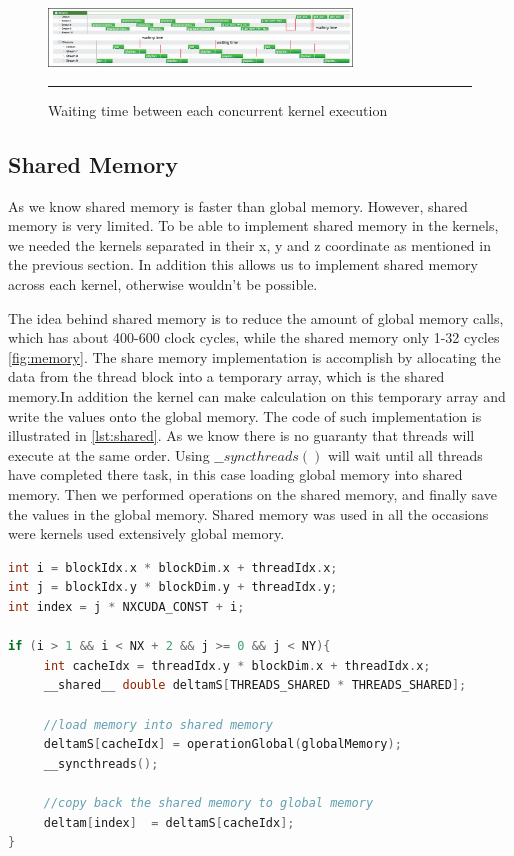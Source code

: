\begin{figure}[htbp]
	\centering
		\includegraphics[width=0.72\textwidth]{Figures/waittime.png}
		\rule{35em}{0.2pt}
	\caption[Waiting time concurrent kernels]{Waiting time between each concurrent kernel execution}
	\label{fig:waittime}
\end{figure}


\subsection{Shared Memory}

As we know shared memory is faster than global memory. However, shared memory is very limited. To be able to implement shared memory in the kernels, we needed the kernels separated in their x, y and z coordinate as mentioned in the previous section. In addition this allows us to implement shared memory across each kernel, otherwise wouldn't be possible.

The idea behind shared memory is to reduce the amount of global memory calls, which has about 400-600 clock cycles, while the shared memory only 1-32 cycles \ref{fig:memory}. The share memory implementation is accomplish by allocating the data from the thread block into a temporary array, which is the shared memory.In addition the kernel can make calculation on this temporary array and write the values onto the global memory. The code of such implementation is illustrated in \ref{lst:shared}. As we know there is no guaranty that threads will execute at the same order. Using $\_\_syncthreads()$ will wait until all threads have completed there task, in this case loading global memory into shared memory. Then we performed operations on the shared memory, and finally save the values in the global memory. Shared memory was used in all the occasions were kernels used extensively global memory.

\begin{lstlisting}[language=C++, label={lst:shared}, caption={Shared memory}]
int i = blockIdx.x * blockDim.x + threadIdx.x;
int j = blockIdx.y * blockDim.y + threadIdx.y;
int index = j * NXCUDA_CONST + i;

if (i > 1 && i < NX + 2 && j >= 0 && j < NY){
     int cacheIdx = threadIdx.y * blockDim.x + threadIdx.x;
     __shared__ double deltamS[THREADS_SHARED * THREADS_SHARED];

	 //load memory into shared memory
     deltamS[cacheIdx] = operationGlobal(globalMemory);
     __syncthreads();

	 //copy back the shared memory to global memory
     deltam[index]  = deltamS[cacheIdx];
}
\end{lstlisting}

